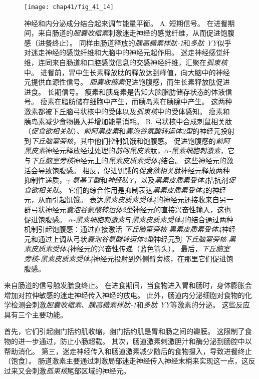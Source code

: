 \begin{figure}[htbp]
	\centering
	\texttt{[image: chap41/fig\_41\_14]}
	\caption{神经和内分泌成分结合起来调节能量平衡。 
		A. 短期信号。
		在进餐期间，来自肠道的\textit{胆囊收缩素}刺激迷走神经的感觉纤维，从而促进饱腹感（进餐终止）。
		同样由肠道释放的\textit{胰高糖素样肽-1}和\textit{多肽 YY}似乎对迷走神经的感觉纤维和大脑中的神经元起作用。
		迷走神经感觉纤维，连同来自肠道和口腔感觉信息的交感神经纤维，汇聚在\textit{孤束核}中。
		进餐前，胃中生长素释放肽的释放达到峰值，向大脑中的神经元提供血源性信号。
		\textit{胆囊收缩素}促进饱腹感，而生长素释放肽促进进食。
		长期信号。
		瘦素和胰岛素是告知大脑脂肪储存状态的体液信号。
		瘦素在脂肪储存细胞中产生，而胰岛素在胰腺中产生。
		这两种激素都被下丘脑弓状核中的受体以及\textit{孤束核}中的受体感知。
		瘦素和胰岛素减少食物摄入并增加能量消耗。
		B. 弓状核中合成刺鼠相关肽（\textit{促食欲相关肽}）、\textit{前阿黑皮素}和\textit{囊泡谷氨酸转运体2型}的神经元投射到\textit{下丘脑室旁核}，其中他们控制饥饿和饱腹感。
		促进饱腹感的\textit{前阿黑皮素}神经元释放经过处理的\textit{前阿黑皮素}肽，\textit{$\alpha$-黑素细胞刺激素}，它与\textit{下丘脑室旁核}神经元上的\textit{黑素皮质素受体4}结合。
		这些神经元的激活会导致饱腹感。
		相反，促进饥饿的\textit{促食欲相关肽}神经元释放两种抑制性递质，\textit{$\gamma$-氨基丁酸}和\textit{神经肽Y}，以及\textit{黑素皮质素受体4}拮抗剂\textit{促食欲相关肽}。
		它们的综合作用是抑制表达\textit{黑素皮质素受体4}的神经元，从而引起饥饿。
		表达\textit{黑素皮质素受体4}的神经元还接收来自另一群弓状神经元\textit{囊泡谷氨酸转运体2型}神经元的直接兴奋性输入，这也促进饱腹感。
		\textit{$\alpha$-黑素细胞刺激素}与\textit{黑素皮质素受体4}的结合通过两种机制引起饱腹感：通过直接激活 \textit{下丘脑室旁核}-\textit{黑素皮质素受体4}神经元和通过上调从弓状\textit{囊泡谷氨酸转运体2型}神经元到 \textit{下丘脑室旁核}-\textit{黑素皮质素受体4}神经元的兴奋性传递（蓝色箭头）。
		最后，\textit{下丘脑室旁核}-\textit{黑素皮质素受体4}神经元投射到外侧臂旁核，在那里它们促进饱腹感。}
	\label{fig:41_14}
\end{figure}


来自肠道的信号触发膳食终止。
在进食期间，当食物进入胃和肠时，身体膨胀会增加对拉伸敏感的迷走神经传入神经的放电。
此外，肠道内分泌细胞对食物的化学检测会刺激\textit{胆囊收缩素}、\textit{胰高糖素样肽-1}和\textit{多肽 YY}等激素的分泌。
这些反应具有三个主要功能。


首先，它们引起幽门括约肌收缩，幽门括约肌是胃和肠之间的瓣膜。
这限制了食物的进一步通过，防止小肠超载。
其次，肠道激素刺激胆汁和酶分泌到肠腔中以帮助消化。
第三，迷走神经传入和肠道激素减少随后的食物摄入，导致进餐终止（饱食）。
肠道激素主要通过刺激局部迷走神经传入神经末梢来实现这一点，这反过来又会刺激\textit{孤束核}尾部区域的神经元。


